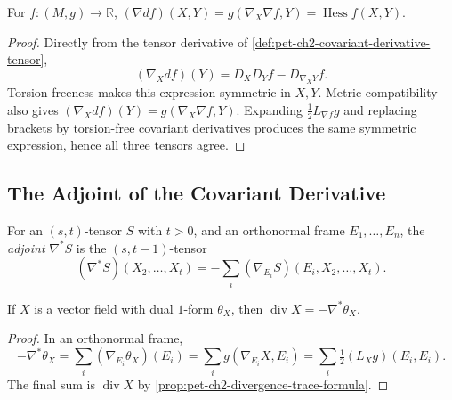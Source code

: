 \begin{proposition}
  \label{prop:pet-ch2-hessian-covariant-derivative}
  \leanok
  For $f:(M,g)\to\mathbb{R}$, $(\nabla df)(X,Y)=g(\nabla_X\nabla f,Y)=\operatorname{Hess}f(X,Y)$.
\end{proposition}
\begin{proof}
  \leanok
  \sketch
  Directly from the tensor derivative of
  \cref{def:pet-ch2-covariant-derivative-tensor},
  \[
    (\nabla_Xdf)(Y)=D_XD_Yf-D_{\nabla_XY}f.
  \]
  Torsion-freeness makes this expression symmetric in $X,Y$. Metric
  compatibility also gives
  $(\nabla_Xdf)(Y)=g(\nabla_X\nabla f,Y)$. Expanding
  $\tfrac12L_{\nabla f}g$ and replacing brackets by torsion-free covariant
  derivatives produces the same symmetric expression, hence all three
  tensors agree.
\end{proof}

\subsection{The Adjoint of the Covariant Derivative}

\begin{definition}
  \label{def:pet-ch2-covariant-derivative-adjoint}
  \leanok
  For an $(s,t)$-tensor $S$ with $t>0$, and an orthonormal frame
  $E_1,\dots,E_n$, the \emph{adjoint} $\nabla^*S$ is the $(s,t-1)$-tensor
  \[
    (\nabla^*S)(X_2,\dots,X_t)=-\sum_i(\nabla_{E_i}S)(E_i,X_2,\dots,X_t).
  \]
\end{definition}

\begin{proposition}
  \label{prop:pet-ch2-divergence-adjoint-formula}
  \leanok
  If $X$ is a vector field with dual $1$-form $\theta_X$, then
  $\operatorname{div}X=-\nabla^*\theta_X$.
\end{proposition}
\begin{proof}
  \leanok
  \sketch
  In an orthonormal frame,
  \[
    -\nabla^*\theta_X
      =\sum_i(\nabla_{E_i}\theta_X)(E_i)
      =\sum_i g(\nabla_{E_i}X,E_i)
      =\sum_i\tfrac12(L_Xg)(E_i,E_i).
  \]
  The final sum is $\operatorname{div}X$ by
  \cref{prop:pet-ch2-divergence-trace-formula}.
\end{proof}


